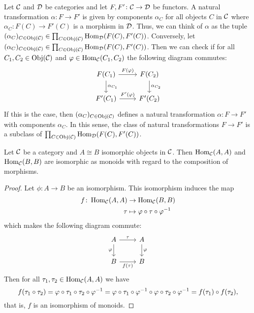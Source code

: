 \begin{rem}
Let $\mathcal{C}$ and $\mathcal{D}$ be categories and let $F,F'\colon \mathcal{C} \to \mathcal{D}$ be functors. A natural transformation $\alpha\colon F \to F'$ is given by components $\alpha_C$ for all objects $C$ in $\mathcal{C}$ where $\alpha_C\colon F(C) \to F'(C)$ is a morphism in $\mathcal{D}$. Thus, we can think of $\alpha$ as the tuple $(\alpha_C)_{C \in \operatorname{Obj}(\mathcal{C})} \in \prod_{C \in \operatorname{Obj}(\mathcal{C})} \operatorname{Hom}_{\mathcal{D}}(F(C),F'(C))$. Conversely, let $(\alpha_C)_{C \in \operatorname{Obj}(\mathcal{C})} \in \prod_{C \in \operatorname{Obj}(\mathcal{C})} \operatorname{Hom}_{\mathcal{D}}(F(C),F'(C))$. Then we can check if for all $C_1,C_2 \in \operatorname{Obj}(\mathcal{C})$ and $\varphi \in \operatorname{Hom}_{\mathcal{C}}(C_1,C_2)$ the following diagram commutes:
\[
\begin{tikzcd}
F(C_1) \arrow[r, "F(\phi)"] \arrow[d, "\alpha_{C_1}"] & F(C_2) \arrow[d, "\alpha_{C_2}"] \\
F'(C_1) \arrow[r, "F'(\phi)"]                         & F'(C_2)                         
\end{tikzcd}
\]
If this is the case, then $(\alpha_C)_{C \in \operatorname{Obj}(\mathcal{C})}$ defines a natural transformation $\alpha\colon F \to F'$ with components $\alpha_C$. In this sense, the class of natural transformations $F \to F'$ is a subclass of $\prod_{C \in \operatorname{Obj}(\mathcal{C})} \operatorname{Hom}_{\mathcal{D}}(F(C),F'(C))$.
\end{rem}

\begin{lem}\label{lem:isomorphic_homs}
Let $\mathcal{C}$ be a category and $A \cong B$ isomorphic objects in $\mathcal{C}$. Then $\operatorname{Hom}_{\mathcal{C}}(A,A)$ and $\operatorname{Hom}_{\mathcal{C}}(B,B)$ are isomorphic as monoids with regard to the composition of morphisms.
\end{lem}
\begin{proof}
Let $\phi\colon A \to B$ be an isomorphism. This isomorphism induces the map
\begin{align*}
f\colon \operatorname{Hom}_{\mathcal{C}}(A,A) &\to \operatorname{Hom}_{\mathcal{C}}(B,B)\\
\tau &\mapsto \varphi \circ \tau \circ \varphi^{-1}
\end{align*}
which makes the following diagram commute:
\[
\begin{tikzcd}
A \arrow[r, "\tau"] \arrow[d, "\phi"'] & A \arrow[d, "\phi"] \\
B \arrow[r, "f(\tau)"']                & B                  
\end{tikzcd}
\]
Then for all $\tau_1,\tau_2 \in \operatorname{Hom}_{\mathcal{C}}(A,A)$ we have \[f(\tau_1 \circ \tau_2) = \varphi \circ \tau_1 \circ \tau_2 \circ \varphi^{-1} = \varphi \circ \tau_1 \circ \varphi^{-1} \circ \varphi \circ \tau_2 \circ \varphi^{-1} = f(\tau_1) \circ f(\tau_2),\] that is, $f$ is an isomorphism of monoids.
\end{proof}

